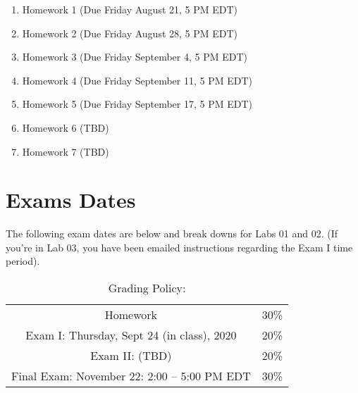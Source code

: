 \documentclass[11pt]{article}
\begin{document}
\begin{enumerate}
\item Homework 1 (Due Friday August 21, 5 PM EDT)
\item Homework 2 (Due Friday August 28, 5 PM EDT)
\item Homework 3 (Due Friday September 4, 5 PM EDT)
\item Homework 4 (Due Friday September 11, 5 PM EDT)
\item Homework 5 (Due Friday September 17, 5 PM EDT)
\item Homework 6 (TBD)
\item Homework 7 (TBD)
\end{enumerate} 


\section{Exams Dates} 
The following exam dates are below and break downs for Labs 01 and 02. (If you're in Lab 03, you have been emailed instructions regarding the Exam I time period). 

\begin{table}[h!]
\caption{Grading Policy:}
\begin{center}
\begin{tabular}{cc}
Homework &30\%\\
Exam I:  Thursday, Sept 24 (in class), 2020 &20\%\\
Exam  II: (TBD) & 20\%\\
Final Exam:  November 22: 2:00 -- 5:00 PM EDT & 30\%\\
\end{tabular}
\end{center}
\label{default}
\end{table}%
\end{document}
